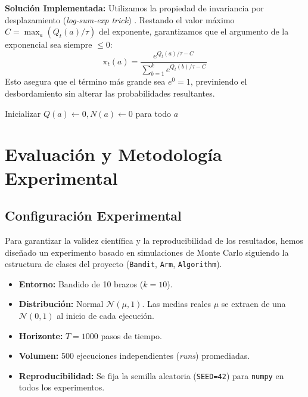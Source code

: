 \documentclass[a4paper,11pt]{article}
\begin{document}
\textbf{Solución Implementada:} Utilizamos la propiedad de invariancia por desplazamiento (\textit{log-sum-exp trick}) \cite{blanchard2021}. Restando el valor máximo $C = \max_a (Q_t(a)/\tau)$ del exponente, garantizamos que el argumento de la exponencial sea siempre $\le 0$:
\begin{equation}
    \pi_t(a) = \frac{e^{Q_t(a)/\tau - C}}{\sum_{b=1}^{k} e^{Q_t(b)/\tau - C}}
\end{equation}
Esto asegura que el término más grande sea $e^0=1$, previniendo el desbordamiento sin alterar las probabilidades resultantes.

\begin{algorithm}[H]
\SetAlgoLined
{}
 Inicializar $Q(a) \leftarrow 0, N(a) \leftarrow 0$ para todo $a$\;
 \caption{Softmax con Estabilidad Numérica}
\end{algorithm}

\section{Evaluación y Metodología Experimental}

\subsection{Configuración Experimental}
Para garantizar la validez científica y la reproducibilidad de los resultados, hemos diseñado un experimento basado en simulaciones de Monte Carlo siguiendo la estructura de clases del proyecto (\texttt{Bandit}, \texttt{Arm}, \texttt{Algorithm}).

\begin{itemize}
    \item \textbf{Entorno:} Bandido de 10 brazos ($k=10$).
    \item \textbf{Distribución:} Normal $\mathcal{N}(\mu, 1)$. Las medias reales $\mu$ se extraen de una $\mathcal{N}(0, 1)$ al inicio de cada ejecución.
    \item \textbf{Horizonte:} $T = 1000$ pasos de tiempo.
    \item \textbf{Volumen:} 500 ejecuciones independientes (\textit{runs}) promediadas.
    \item \textbf{Reproducibilidad:} Se fija la semilla aleatoria (\texttt{SEED=42}) para \texttt{numpy} en todos los experimentos.
\end{itemize}
\end{document}
